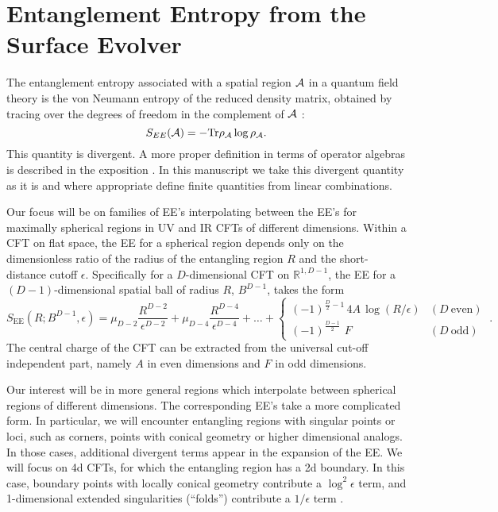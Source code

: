 \documentclass[11 pt]{article}
\def\RR{{\mathds{R}}}
\newcommand{\fft}[2]{\frac{#1}{#2}}
\begin{document}
\section{Entanglement Entropy from the Surface Evolver}\label{Sec:EntropyGeneral}

The entanglement entropy associated with a spatial region $\cal A$ in a quantum field theory is the von Neumann entropy of the reduced density matrix, obtained by tracing over the degrees of freedom in the complement of $\cal A$  \cite{Srednicki1993,Casini2009}:
\begin{equation}
    S_{EE}({\cal A}) = -{\rm Tr} \rho_{\cal A} \log \rho_{\cal A}.
\end{equation}
This quantity is divergent. A more proper definition in terms of  operator algebras is described in the exposition  \cite{Witten:2018zxz}. In this manuscript we take this divergent quantity as it is and where appropriate define finite quantities from linear combinations.

Our focus will be on families of EE's interpolating between the EE's for maximally spherical regions in UV and IR CFTs of different dimensions. Within a CFT on flat space, the EE for a spherical region depends only on the dimensionless ratio of the radius of the entangling region $R$ and the short-distance cutoff $\epsilon$.
Specifically for a $D$-dimensional CFT on $\RR^{1,D-1}$, the EE for a $(D-1)$-dimensional spatial ball of radius $R$, $B^{D-1}$, takes the form 
%
\begin{equation}
\label{Eq:EE-General}
    S_\text{EE}(R;B^{D-1},\epsilon)=\mu_{D-2}\fft{R^{D-2}}{\epsilon^{D-2}}+\mu_{D-4}\fft{R^{D-4}}{\epsilon^{D-4}} + \ldots +
    \begin{cases}
	(-1)^{\frac{D}{2}-1} \, 4A \, \log (R/\epsilon) &(D~\text{even})\\
	(-1)^{\frac{D-1}{2} }\,\,F & (D~\text{odd})
    \end{cases}~.
\end{equation}
%
The central charge of the CFT can be extracted from the universal cut-off independent part, namely $A$ in even dimensions and $F$ in odd dimensions. 

Our interest will be in more general regions which interpolate between spherical regions of different dimensions. 
The corresponding EE's take a more complicated form.
In particular, we will encounter entangling regions with singular points or loci, such as corners, points with conical geometry or higher dimensional analogs. In those cases, additional divergent terms appear in the expansion of the EE. We will focus on 4d CFTs, for which the entangling region has a 2d boundary. In this case, boundary points with locally conical geometry contribute a $\log^2{\epsilon}$ term, and 1-dimensional extended singularities (``folds'') contribute a $1/\epsilon$ term \cite{Myers2012}.
\end{document}
